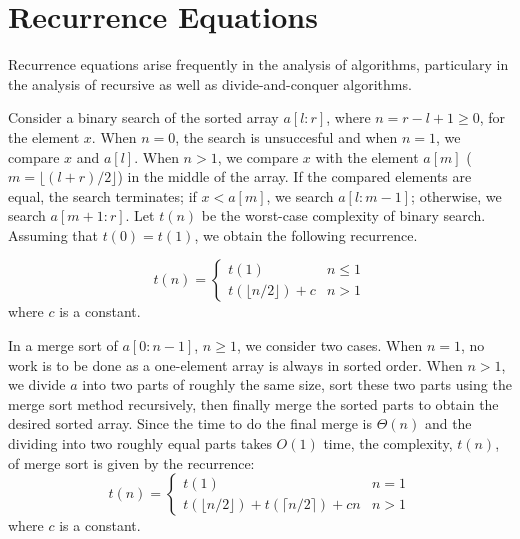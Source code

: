 \section{Recurrence Equations}
Recurrence equations arise frequently in the analysis of algorithms, particulary
in the analysis of recursive as well as divide-and-conquer algorithms.
\begin{example}
Consider
a binary search of the sorted array $a[l:r]$, where
$n = r - l + 1 \geq 0$,
for the
element $x$. When $n = 0$, the search is unsuccesful and when
$n = 1$, we compare $x$ and $a[l]$.
When $n > 1$, we compare $x$ with the element
$a[m]$ ($m = \lfloor (l+r)/2\rfloor$)
in the middle of the
array. If the compared elements are equal, the search terminates; if $x
< a[m]$, we search $a[l:m-1]$; otherwise, we search
$a[m+1:r]$.
Let $t(n)$ be the worst-case complexity of binary search. Assuming that
$t(0) = t(1)$,
we obtain the
following recurrence.

\begin{equation}\label{eqn:bin1}
t(n) =  \left \{
         \begin{array}{ll}
            t(1) & n \leq 1\\
    t(\lfloor n / 2\rfloor)+c &  n > 1
          \end{array}
         \right.
\end{equation}
where $c$ is a constant.
\end{example}

\begin{example}
In
a merge sort of $a[0:n-1]$, $n \geq 1$, we consider two cases.
When $n = 1$, no work is to be done as a one-element array is always in
sorted order. When $n > 1$, we divide
$a$ into two parts of roughly the same size,
sort these two parts using the merge sort
method recursively, then finally merge the sorted parts to obtain the desired
sorted array.
Since the time to do the final merge is $\Theta (n)$ and the dividing
into two roughly equal parts takes $O(1)$ time, the complexity, $t(n)$,
of merge sort is given by the recurrence:
\begin{equation}\label{eqn:merge1}
t(n) =  \left \{
         \begin{array}{ll}
            t(1) & n = 1\\
    t(\lfloor n / 2\rfloor)+t(\lceil n/2\rceil)+cn &  n > 1
          \end{array}
         \right.
\end{equation}
where $c$ is a constant.
\end{example}

